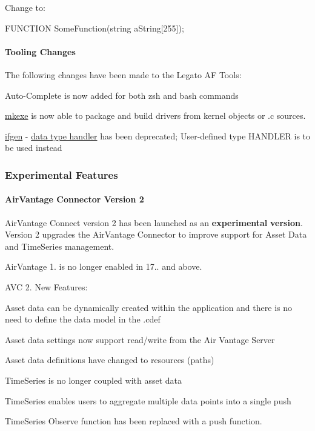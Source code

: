 Change to\+:


\begin{DoxyCode}
FUNCTION SomeFunction(\textcolor{keywordtype}{string} aString[255]);
\end{DoxyCode}
\hypertarget{releaseNotes17050_rn17_05_FeaturesTools}{}\paragraph{Tooling Changes}\label{releaseNotes17050_rn17_05_FeaturesTools}
The following changes have been made to the Legato AF Tools\+:
\begin{DoxyItemize}
\item Auto-\/\+Complete is now added for both zsh and bash commands
\item \hyperlink{buildToolsmkexe}{mkexe} is now able to package and build drivers from kernel objects or {\ttfamily }.c sources.
\item \hyperlink{buildToolsifgen}{ifgen} -\/ \hyperlink{apiFilesSyntax_apiFilesSyntax_types}{data type handler} has been deprecated; User-\/defined type {\ttfamily H\+A\+N\+D\+L\+ER} is to be used instead
\end{DoxyItemize}\hypertarget{releaseNotes17050_rn17_05_FeaturesExperimental}{}\subsubsection{Experimental Features}\label{releaseNotes17050_rn17_05_FeaturesExperimental}
\hypertarget{releaseNotes17050_rn17_05_FeaturesExperimentalAirVantage}{}\paragraph{Air\+Vantage Connector Version 2}\label{releaseNotes17050_rn17_05_FeaturesExperimentalAirVantage}
Air\+Vantage Connect version 2 has been launched as an {\bfseries experimental} {\bfseries version}. Version 2 upgrades the Air\+Vantage Connector to improve support for Asset Data and Time\+Series management.

Air\+Vantage 1. is no longer enabled in 17.. and above.

A\+VC 2. New Features\+:
\begin{DoxyItemize}
\item Asset data can be dynamically created within the application and there is no need to define the data model in the {\ttfamily }.cdef
\item Asset data settings now support read/write from the Air Vantage Server
\item Asset data definitions have changed to resources (paths)
\item Time\+Series is no longer coupled with asset data
\item Time\+Series enables users to aggregate multiple data points into a single push
\item Time\+Series Observe function has been replaced with a push function.
\end{DoxyItemize}

